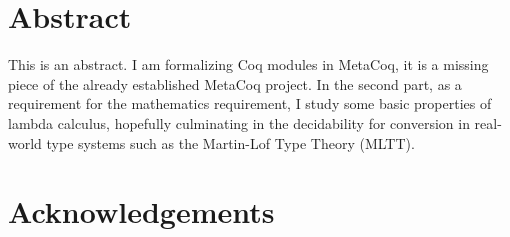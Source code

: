 

\dedication{
	The harmony of the world is made manifest in Form and Number, and the heart and soul and all the poetry of Natural Philosophy are embodied in the concept of mathematical beauty.\\
	\flushright -- D'Arcy Wentworth Thompson
}


\maketitle

\begingroup
  \let\cleardoublepage\clearpage
\chapter*{Abstract}

This is an abstract. I am formalizing Coq modules in MetaCoq, it is a missing
piece of the already established MetaCoq project. In the second part, as a
requirement for the mathematics requirement, I study some basic properties of
lambda calculus, hopefully culminating in the decidability for conversion in
real-world type systems such as the Martin-Lof Type Theory (MLTT).

\chapter*{Acknowledgements}

